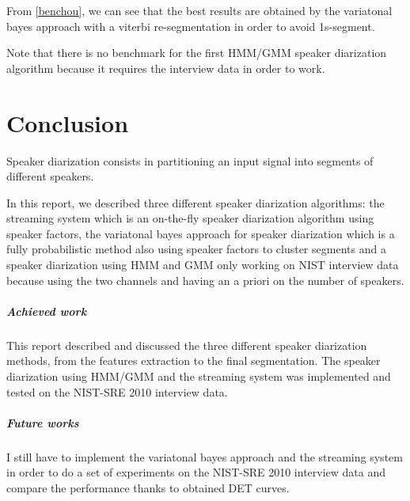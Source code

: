 \documentclass{techrep} %
\begin{document}
From \ref{benchou}, we can see that the best results are obtained by the variatonal bayes approach with a viterbi re-segmentation in order to avoid 1s-segment.

Note that there is no benchmark for the first HMM/GMM speaker
diarization algorithm because it requires the interview data in order
to work.

\chapter{Conclusion}

Speaker diarization consists in partitioning an input signal into
segments of different speakers.

In this report, we described three different speaker diarization
algorithms: the streaming system which is an on-the-fly speaker
diarization algorithm using speaker factors, the variatonal bayes
approach for speaker diarization which is a fully probabilistic method
also using speaker factors to cluster segments and a speaker
diarization using HMM and GMM only working on NIST interview data
because using the two channels and having an a priori on the number of
speakers.

\paragraph{Achieved work} This report described and discussed the three different speaker diarization methods, from the features extraction to the final segmentation. The speaker diarization using HMM/GMM and the streaming system was implemented and tested on the NIST-SRE 2010 interview data.

\paragraph{Future works} I still have to implement the variatonal bayes approach and the streaming system in order to do a set of experiments on the NIST-SRE 2010 interview data and compare the performance thanks to obtained DET curves.

 \nocite{*}
\end{document}
